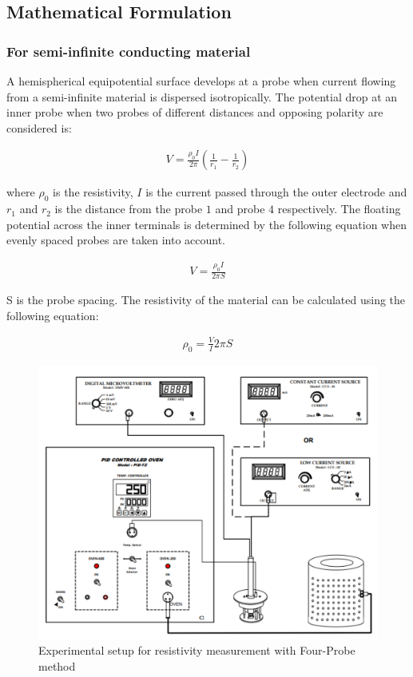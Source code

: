 \subsection{Mathematical Formulation}
\subsubsection*{For semi-infinite conducting material}
A hemispherical equipotential surface develops at a probe when current flowing from a semi-infinite material is dispersed isotropically. The potential drop at an inner probe when two probes of different distances and opposing polarity are considered is:

\begin{align}
    V = \frac{\rho_0I}{2\pi}\left(\frac{1}{r_1}-\frac{1}{r_2}\right)
\end{align}

where $\rho_0$ is the resistivity, $I$ is the current passed through the outer electrode and $r_1$ and $r_2$ is the distance from the probe $1$ and probe $4$ respectively. The floating potential across the inner terminals is determined by the following equation when evenly spaced probes are taken into account.

\begin{align}V=\frac{\rho_0I}{2\pi S}\end{align}

S is the probe spacing. The resistivity of the material can be calculated using the following equation:

\begin{align} \label{e1}
    \rho_0 = \frac{V}{I} 2\pi S
\end{align}

\begin{figure}
    \centering
    \includegraphics[width=1.3\columnwidth]{images/expt.png}
    \caption{Experimental setup for resistivity measurement with Four-Probe method}
\end{figure}

